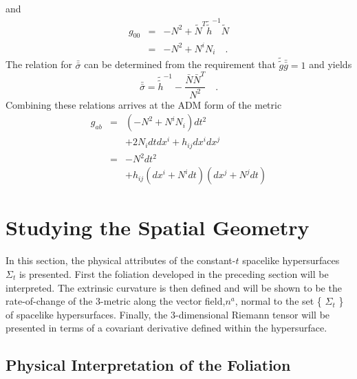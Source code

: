 \documentclass[twocolumn]{article}
\def\.{{\quad .}}
\begin{document}
and
\begin{eqnarray*}
   g_{00} & = &  -N^2 + {\tilde N}^T {\tilde {\tilde h}}^{-1} \tilde N \\
          & = &  -N^2 + N^{i} N_{i} \.
\end{eqnarray*}
The relation for ${\bar {\bar \sigma}}$ can be determined from the requirement
that ${\tilde {\tilde g}} {\bar {\bar g}} = 1$ and yields
\[
   {\bar {\bar \sigma}} = {\tilde {\tilde h}}^{-1}
                          - \frac{ \bar N {\bar N}^T }{N^2} \.
\]
Combining these relations arrives at the ADM form of the metric
\begin{eqnarray}\label{eq:g_ADM}
   g_{ab} & = & \left( -N^2 + N^i N_i \right) dt^2 \nonumber \\
          &   &  + 2 N_i dt dx^i + h_{ij} dx^i dx^j \nonumber \\
          & = & -N^2 dt^2 \nonumber \\
          &   & + h_{ij}\left(dx^i + N^i dt\right) \left(dx^j + N^j dt\right)
\end{eqnarray}


\section{Studying the Spatial Geometry}

In this section, the physical attributes of the constant-$t$ spacelike
hypersurfaces $\Sigma_t$ is presented.  First the foliation developed in the
preceding section will be interpreted.  The extrinsic curvature is then
defined and will be shown to be the rate-of-change of the 3-metric along
the vector field,$n^a$, normal to the set \{ $\Sigma_t$ \} of spacelike hypersurfaces.
Finally, the 3-dimensional Riemann tensor will be presented in terms of a
covariant derivative defined within the hypersurface.



\subsection{Physical Interpretation of the Foliation}
\end{document}
